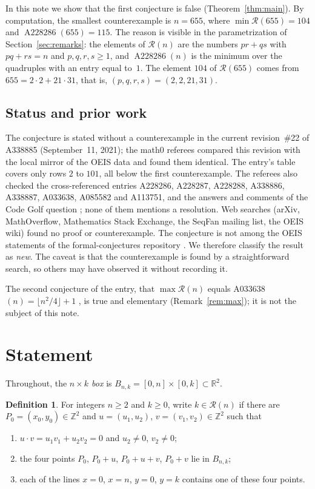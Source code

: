 \documentclass[11pt]{amsart}
\theoremstyle{plain}
\theoremstyle{definition}
\newtheorem{definition}[theorem]{Definition}
\newcommand{\Z}{\mathbb{Z}}
\newcommand{\R}{\mathcal{R}}
\newcommand{\Aa}{\operatorname{A228286}}
\begin{document}
In this note we show that the first conjecture is false (Theorem~\ref{thm:main}). By computation, the smallest counterexample is $n=655$, where $\min\R(655)=104$ and $\Aa(655)=115$. The reason is visible in the parametrization of Section~\ref{sec:remarks}: the elements of $\R(n)$ are the numbers $pr+qs$ with $pq+rs=n$ and $p,q,r,s\ge1$, and $\Aa(n)$ is the minimum over the quadruples with an entry equal to~$1$. The element $104$ of $\R(655)$ comes from $655=2\cdot2+21\cdot31$, that is, $(p,q,r,s)=(2,2,21,31)$.

\subsection*{Status and prior work}
The conjecture is stated without a counterexample in the current revision~\#22 of A338885 (September~11, 2021); the math0 referees compared this revision with the local mirror of the OEIS data and found them identical. The entry's table covers only rows $2$ to $101$, all below the first counterexample. The referees also checked the cross-referenced entries A228286, A228287, A228288, A338886, A338887, A033638, A085582 and A113751, and the answers and comments of the Code Golf question \cite{CGSE}; none of them mentions a resolution. Web searches (arXiv, MathOverflow, Mathematics Stack Exchange, the SeqFan mailing list, the OEIS wiki) found no proof or counterexample. The conjecture is not among the OEIS statements of the formal-conjectures repository \cite{FC}. We therefore classify the result as \emph{new}. The caveat is that the counterexample is found by a straightforward search, so others may have observed it without recording it.

The second conjecture of the entry, that $\max\R(n)$ equals A033638$(n)=\lfloor n^2/4\rfloor+1$ \cite{A033638}, is true and elementary (Remark~\ref{rem:max}); it is not the subject of this note.

\section{Statement}\label{sec:statement}

Throughout, the \emph{$n\times k$ box} is $B_{n,k}=[0,n]\times[0,k]\subset\mathbb{R}^2$.

\begin{definition}\label{def:row}
For integers $n\ge2$ and $k\ge0$, write $k\in\R(n)$ if there are $P_0=(x_0,y_0)\in\Z^2$ and $u=(u_1,u_2)$, $v=(v_1,v_2)\in\Z^2$ such that
\begin{enumerate}
\item $u\cdot v=u_1v_1+u_2v_2=0$ and $u_2\ne0$, $v_2\ne0$;
\item the four points $P_0$, $P_0+u$, $P_0+u+v$, $P_0+v$ lie in $B_{n,k}$;
\item each of the lines $x=0$, $x=n$, $y=0$, $y=k$ contains one of these four points.
\end{enumerate}
\end{definition}
\end{document}
